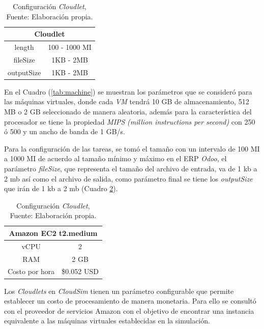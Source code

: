 \setcounter{table}{3}
\renewcommand\thetable{\arabic{table}}
\begin{table}[h!]
	\centering
	\begin{tabular}{@{}cc@{}}
		\toprule
		\multicolumn{2}{c}{{\bf Cloudlet}} \\ \midrule
		length           & 100 - 1000 MI       \\
		fileSize     & 1KB - 2MB      \\
		outputSize           & 1KB - 2MB      \\ \midrule
	  
	\end{tabular}
	\caption{Configuraci\'on \textit{Cloudlet}, Fuente: Elaboraci\'on propia.}
	\label{tab:cloudlet}
\end{table}


En el Cuadro (\ref{tab:machine}) se muestran los par\'ametros que se consider\'o para las m\'aquinas virtuales, donde cada \textit{VM} tendr\'a 10 GB de almacenamiento, 512 MB  o 2 GB seleccionado de manera aleatoria, adem\'as para la caracter\'istica del procesador se tiene  la propiedad \textit{MIPS} \textit{(million instructions per second)} con 250 \'o 500 y un ancho de banda de 1 GB/s.

Para la configuraci\'on de las tareas, se tom\'o el tamaño con un intervalo de 100 MI a 1000 MI de acuerdo al tamaño mínimo y máximo en el ERP \textit{Odoo},  el par\'ametro \textit{fileSize}, que representa el tamaño del archivo de entrada, va de 1 kb a 2 mb as\'i como el archivo de salida, como par\'ametro final se tiene los \textit{outputSize} que ir\'an de 1 kb a 2 mb (Cuadro \ref{tab:cloudlet}).


\setcounter{table}{4}
\renewcommand\thetable{\arabic{table}}
\begin{table}[h!]
	\centering
	\begin{tabular}{@{}cc@{}}
		\toprule
		\multicolumn{2}{c}{{\bf Amazon EC2 t2.medium}} \\ \midrule
		vCPU     & 2     \\
		RAM &2 GB \\
		Costo por hora           & \$0.052 USD      \\ \midrule
		
	\end{tabular}
	\caption{Configuraci\'on \textit{Cloudlet}, Fuente: Elaboraci\'on propia.}
	\label{tab:cloudlet}
\end{table}

Los \textit{Cloudlets} en \textit{CloudSim} tienen un parámetro configurable que permite establecer un costo de procesamiento de manera monetaria. Para ello se consultó con el proveedor de servicios Amazon con el objetivo de  encontrar una instancia equivalente a las máquinas virtuales establecidas en la simulación. 

